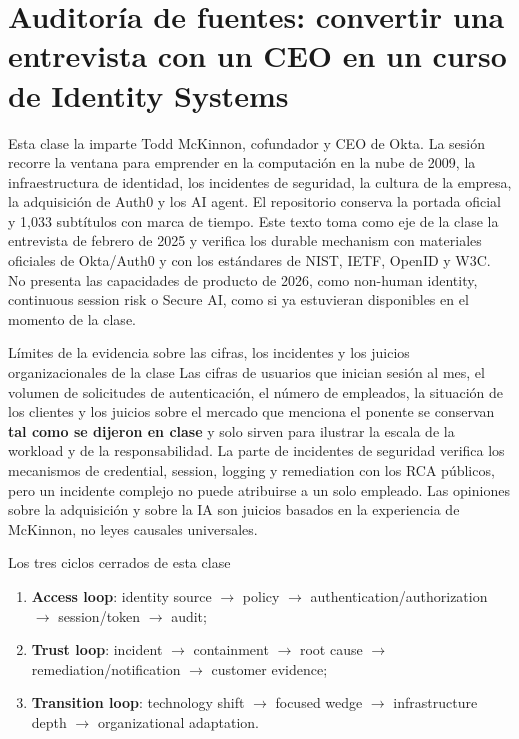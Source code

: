\documentclass[a4paper]{article}
\begin{document}
\makecscover

\section{Auditoría de fuentes: convertir una entrevista con un CEO en un curso de Identity Systems}

Esta clase la imparte Todd McKinnon, cofundador y CEO de Okta. La sesión recorre la ventana para emprender en la computación en la nube de 2009, la infraestructura de identidad, los incidentes de seguridad, la cultura de la empresa, la adquisición de Auth0 y los AI agent. El repositorio conserva la portada oficial y 1,033 subtítulos con marca de tiempo. Este texto toma como eje de la clase la entrevista de febrero de 2025 y verifica los durable mechanism con materiales oficiales de Okta/Auth0 y con los estándares de NIST, IETF, OpenID y W3C. No presenta las capacidades de producto de 2026, como non-human identity, continuous session risk o Secure AI, como si ya estuvieran disponibles en el momento de la clase.

\begin{warningbox}{Límites de la evidencia sobre las cifras, los incidentes y los juicios organizacionales de la clase}
Las cifras de usuarios que inician sesión al mes, el volumen de solicitudes de autenticación, el número de empleados, la situación de los clientes y los juicios sobre el mercado que menciona el ponente se conservan \textbf{tal como se dijeron en clase} y solo sirven para ilustrar la escala de la workload y de la responsabilidad. La parte de incidentes de seguridad verifica los mecanismos de credential, session, logging y remediation con los RCA públicos, pero un incidente complejo no puede atribuirse a un solo empleado. Las opiniones sobre la adquisición y sobre la IA son juicios basados en la experiencia de McKinnon, no leyes causales universales.
\end{warningbox}

\begin{importantbox}{Los tres ciclos cerrados de esta clase}
\begin{enumerate}
  \item \textbf{Access loop}: identity source $\rightarrow$ policy $\rightarrow$ authentication/authorization $\rightarrow$ session/token $\rightarrow$ audit;
  \item \textbf{Trust loop}: incident $\rightarrow$ containment $\rightarrow$ root cause $\rightarrow$ remediation/notification $\rightarrow$ customer evidence;
  \item \textbf{Transition loop}: technology shift $\rightarrow$ focused wedge $\rightarrow$ infrastructure depth $\rightarrow$ organizational adaptation.
\end{enumerate}
\end{importantbox}
\end{document}
